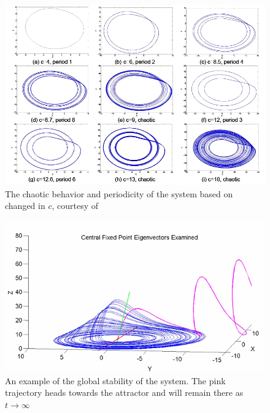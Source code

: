 \documentclass{article}
\begin{document}
\begin{figure}[h]
	\centering
	\includegraphics[scale=0.5]{varying_c}
	\caption{The chaotic behavior and periodicity of the system based on changed in $c$, courtesy of \cite{rossler_bifur}}
	\label{fig:c_chaos}
\end{figure}

\begin{figure}
	\centering
	\includegraphics[scale=0.6]{attractive}
	\caption{An example of the global stability of the system. The pink trajectory heads towards the attractor and will remain there as $t\to\infty$ \cite{rossler_bifur} }
	\label{fig:attractive}
\end{figure}

\newpage
\clearpage
\nocite{*}
\printbibliography
\end{document}
